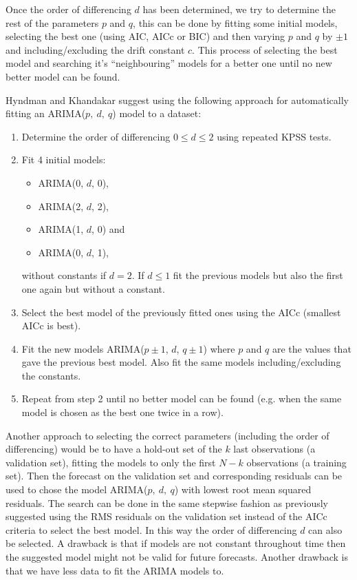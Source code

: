 \documentclass[a4paper, 12pt]{scrartcl}
\begin{document}
Once the order of differencing $d$ has been determined, we try to determine the rest of the parameters $p$ and $q$, this can be done by fitting some initial models, selecting the best one (using AIC, AICc or BIC) and then varying $p$ and $q$ by $\pm 1$ and including/excluding the drift constant $c$.
This process of selecting the best model and searching it's ``neighbouring'' models for a better one until no new better model can be found.

Hyndman and Khandakar \cite{art:hyndkhand} suggest using the following approach for automatically fitting an ARIMA($p,~d,~q$) model to a dataset:
\begin{enumerate}
	\item Determine the order of differencing $0\leq d \leq 2$ using repeated KPSS tests.
	\item Fit 4 initial models:
	\begin{itemize}
		\item ARIMA(0, $d$, 0),
		\item ARIMA(2, $d$, 2),
		\item ARIMA(1, $d$, 0) and
		\item ARIMA(0, $d$, 1),
	\end{itemize}
	without constants if $d=2$. If $d\leq 1$ fit the previous models but also the first one again but without a constant.
	\item Select the best model of the previously fitted ones using the AICc (smallest AICc is best).
	\item Fit the new models ARIMA($p\pm1$, $d$, $q\pm1$) where $p$ and $q$ are the values that gave the previous best model. Also fit the same models including/excluding the constants.
	\item Repeat from step 2 until no better model can be found (e.g. when the same model is chosen as the best one twice in a row).
\end{enumerate}

Another approach to selecting the correct parameters (including the order of differencing) would be to have a hold-out set of the $k$ last observations (a validation set), fitting the models to only the first $N-k$ observations (a training set).
Then the forecast on the validation set and corresponding residuals can be used to chose the model ARIMA($p,~d,~q$) with lowest root mean squared residuals.
The search can be done in the same stepwise fashion as previously suggested using the RMS residuals on the validation set instead of the AICc criteria to select the best model.
In this way the order of differencing $d$ can also be selected.
A drawback is that if models are not constant throughout time then the suggested model might not be valid for future forecasts.
Another drawback is that we have less data to fit the ARIMA models to.
\end{document}
